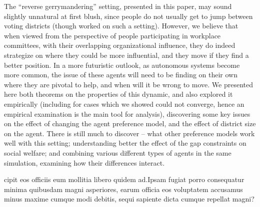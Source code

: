 \documentclass[letterpaper]{article} %
\begin{document}
The ``reverse gerrymandering'' setting, presented in this paper, may sound slightly unnatural at first blush, since people do not usually get to jump between voting districts (though \cite{BM12} worked on such a setting). However, we believe that when viewed from the perspective of people participating in workplace committees, with their overlapping organizational influence, they do indeed strategize on where they could be more influential, and they move if they find a better position. In a more futuristic outlook, as autonomous systems become more common, the issue of these agents will need to be finding on their own where they are pivotal to help, and when will it be wrong to move.
We presented here both theorems on the properties of this dynamic, and also explored it empirically (including for cases which we showed could not converge, hence an empirical examination is the main tool for analysis), discovering some key issues on the effect of changing the agent preference model, and the effect of district size on the agent. There is still much to discover -- what other preference models work well with this setting; understanding better the effect of the gap constraints on social welfare; and combining various different types of agents in the same simulation, examining how their differences interact.


cipit eos officiis eum mollitia libero quidem ad.Ipsam fugiat porro consequatur minima quibusdam magni asperiores, earum officia eos voluptatem accusamus minus maxime cumque modi debitis, sequi sapiente dicta cumque repellat magni?\clearpage


\end{document}
